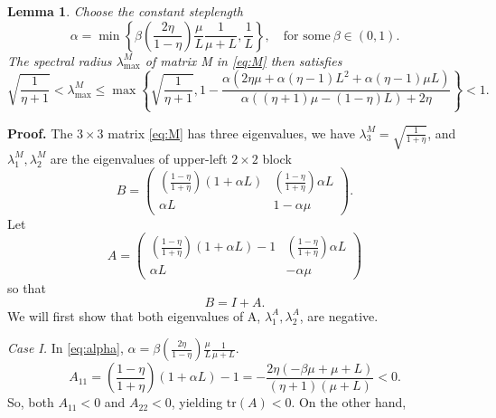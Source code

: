 \documentclass[11pt]{article}
\newtheorem{lem}[thm]{Lemma}
\begin{document}
\begin{lem} \label{lemma:spectral}
 Choose the constant steplength
 \begin{equation}\label{eq:alpha}
    \alpha = \min\left\lbrace\beta\left(\frac{2 \eta}{1-\eta} \right)\frac{\mu}{L}\frac{1}{\mu+L},\frac{1}{L}\right\rbrace, \quad \mbox{for some} \ \beta  \in(0,1).
 \end{equation}
 The spectral radius $\lambda^M_{\max}$ of matrix M in \eqref{eq:M} then satisfies
 \begin{equation}\label{eq:spectral}
  \sqrt{\frac{1}{\eta +1}}<\lambda^M_{\max} \leq \max\left\lbrace \sqrt{\frac{1}{\eta +1}}, 1-\frac{\alpha  \left(2 \eta  \mu +\alpha  (\eta -1) L^2+\alpha  (\eta -1) \mu  L\right)}{\alpha  ((\eta +1) \mu -  (1-\eta ) L)+2 \eta }\right\rbrace<1 . 
 \end{equation}
\end{lem}


\textbf{Proof.}  The $3\times 3$ matrix \eqref{eq:M} has three eigenvalues, we have $\lambda^M_3=\sqrt{\frac{1}{1+\eta}}$, and $\lambda^M_1,\lambda^M_2$ are the eigenvalues of upper-left $2\times 2$ block
\begin{equation}
 B = \begin{pmatrix} (\frac{1-\eta}{1+\eta})(1+\alpha  L)  &    (\frac{1-\eta}{1+\eta})\alpha L \\  
                   \alpha L  & 1-\alpha \mu \end{pmatrix}.                    
\end{equation} 
Let 
\[
A = \begin{pmatrix} (\frac{1-\eta}{1+\eta})(1+\alpha  L)-1 & (\frac{1-\eta}{1+\eta})\alpha L\\  
                   \alpha L  & -\alpha\mu \end{pmatrix}  
\]
so that
\[
 B = I + A.
\]
We will first show that both eigenvalues of A, $\lambda^A_1,\lambda^A_2$, are negative.  

\bigskip

\textit{Case I.} In \eqref{eq:alpha}, $\alpha = \beta\left(\frac{2 \eta}{1-\eta} \right)\frac{\mu}{L}\frac{1}{\mu+L}$. 
\[
A_{11} = (\frac{1-\eta}{1+\eta})(1+\alpha  L)-1 =-\frac{2 \eta  (-\beta  \mu +\mu +L)}{(\eta +1) (\mu +L)}< 0.
\]
So, both $A_{11}<0$ and $A_{22}<0$, yielding $\mbox{tr}(A)<0$.  On the other hand, 
\end{document}
